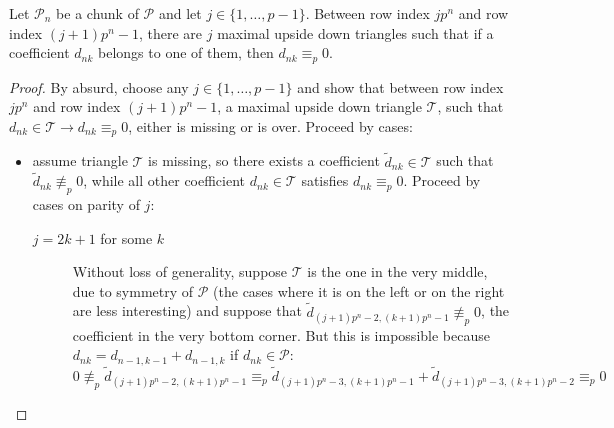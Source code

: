 \begin{lemma}
    Let $\mathcal{P}_n$ be a chunk of $\mathcal{P}$ and let $j\in
    \lbrace 1, \ldots, p-1 \rbrace$. Between row index $j p^n$ and
    row index $(j+1)p^n -1$, there are $j$ maximal upside down triangles
    such that if a coefficient $d_{nk}$ belongs to one of them, then 
    $d_{nk} \equiv_{p} 0$.
\end{lemma}

\begin{proof}
    By absurd, choose any $j\in \lbrace 1, \ldots, p-1 \rbrace$ and show
    that between row index $j p^n$ and row index $(j+1)p^n -1$, 
    a maximal upside down triangle $\mathcal{T}$,
    such that $d_{nk}\in\mathcal{T} \rightarrow d_{nk} \equiv_{p} 0$,
    either is missing or is over. Proceed by cases:
    \begin{itemize}
        \item assume triangle $\mathcal{T}$ is missing, so there exists a coefficient
                $\tilde{d}_{nk}\in\mathcal{T}$ such that $\tilde{d}_{nk}\not\equiv_{p}0$, while all 
                other coefficient $d_{nk}\in\mathcal{T}$ satisfies $d_{nk} \equiv_{p}0$.
                Proceed by cases on parity of $j$:
            \begin{description}
                \item[$j=2k+1$ for some $k$] Without loss of generality, suppose $\mathcal{T}$ is the one in the 
                very middle, due to symmetry of $\mathcal{P}$ (the cases where it is on the left or 
                on the right are less interesting) and
                suppose that $\tilde{d}_{(j+1) p^n -2, (k+1)p^n -1}\not\equiv_{p}0$, the coefficient in the very bottom corner.
                But this is impossible because $d_{nk} = d_{n-1,k-1} + d_{n-1, k}$ if $d_{nk}\in \mathcal{P}$:
                \begin{displaymath}
                0\not\equiv_{p}\tilde{d}_{(j+1) p^n -2, (k+1)p^n -1} \equiv_{p} 
                    \tilde{d}_{(j+1) p^n -3, (k+1)p^n -1} + \tilde{d}_{(j+1) p^n -3, (k+1)p^n-2 }\equiv_{p}0
                \end{displaymath}


\end{description}
\end{itemize}
\end{proof}
